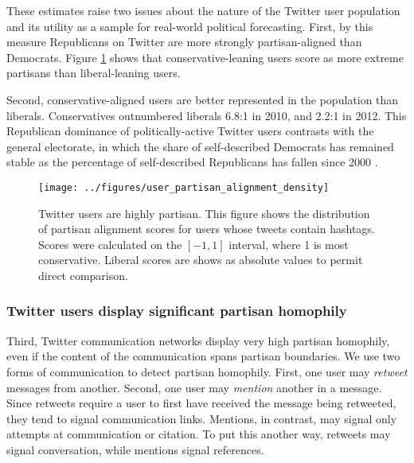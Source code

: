 \documentclass{article}
\begin{document}
These estimates raise two issues about the nature of the Twitter
user population and its utility as a sample for real-world political
forecasting. First, by this measure Republicans on Twitter are more
strongly partisan-aligned than Democrats. Figure
\ref{fig:user-pscore-distribution} shows that conservative-leaning
users score as more extreme partisans than liberal-leaning users.

Second, conservative-aligned users are better represented in the
population than liberals. Conservatives outnumbered liberals 6.8:1 in
2010, and 2.2:1 in 2012. This Republican dominance of
politically-active Twitter users contrasts with the general electorate,
in which the share of self-described Democrats has remained stable as
the percentage of self-described Republicans has fallen since 2000
\cite{pew2012}.



\begin{figure}[ht]
  \centering
  \texttt{[image: ../figures/user\_partisan\_alignment\_density]}
  \caption{Twitter users are highly partisan. This figure shows the distribution of partisan alignment
    scores for users whose tweets contain hashtags. Scores were
    calculated on the $[-1 , 1]$ interval, where 1 is most
    conservative. Liberal scores are shows as absolute values to permit direct comparison.}
  \label{fig:user-pscore-distribution}
\end{figure}




\subsubsection{Twitter users display significant partisan homophily}
\label{sec:twitt-users-displ}


Third, Twitter communication networks display very high partisan
homophily, even if the content of the communication spans partisan
boundaries. We use two forms of communication to detect partisan
homophily. First, one user may \textit{retweet} messages from
another. Second, one user may \textit{mention} another in a
message. Since retweets require a user to first have received the
message being retweeted, they tend to signal communication
links. Mentions, in contrast, may signal only attempts at
communication or citation. To put this another way, retweets may
signal conversation, while mentions signal references.
\end{document}
